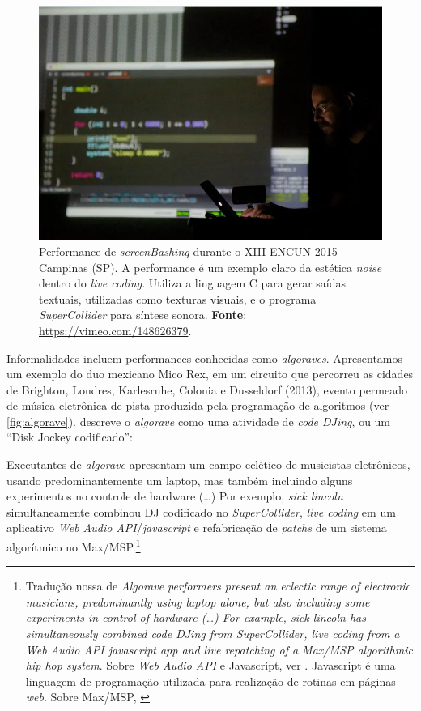 \begin{figure}[!h]
  \centering
  \includegraphics[scale=0.5]{imagens/screenbashing.png}
  \caption{Performance de \emph{screenBashing} durante o XIII ENCUN 2015 - Campinas (SP). A performance é um exemplo claro da estética \emph{noise} dentro do \emph{live coding}. Utiliza a linguagem C para gerar saídas textuais, utilizadas como texturas visuais, e o programa \emph{SuperCollider} para síntese sonora. \textbf{Fonte}: \url{https://vimeo.com/148626379}.}
  \label{fig:screenbashing}
\end{figure}

Informalidades incluem performances conhecidas como \emph{algoraves}. Apresentamos um exemplo do duo mexicano Mico Rex, em um circuito que percorreu as cidades de Brighton, Londres, Karlesruhe, Colonia e Dusseldorf (2013), evento permeado de música eletrônica de pista produzida pela programação de algoritmos (ver \autoref{fig:algorave}).  descreve o \emph{algorave} como uma atividade de \emph{code DJing}, ou um ``Disk Jockey codificado'':

\begin{citacao}
Executantes de \emph{algorave} apresentam um campo eclético de musicistas eletrônicos, usando predominantemente um laptop, mas também incluindo alguns experimentos no controle de hardware (\ldots) Por exemplo, \emph{sick lincoln} simultaneamente combinou DJ codificado no \emph{SuperCollider}, \emph{live coding} em um aplicativo \emph{Web Audio API}/\emph{javascript} e refabricação de \emph{patchs} de um sistema algorítmico no Max/MSP.\footnote{Tradução nossa de \emph{Algorave performers present an eclectic range of electronic musicians, predominantly using laptop alone, but also including some experiments in control of hardware (\ldots)  For example, \emph{sick lincoln} has simultaneously combined code DJing from SuperCollider, live coding from a Web Audio API javascript app and live repatching of a Max/MSP algorithmic hip hop system}. Sobre \emph{Web Audio API} e Javascript, ver . Javascript é uma linguagem de programação utilizada para realização de rotinas em páginas \emph{web}. Sobre Max/MSP, \url{}}
\end{citacao}

